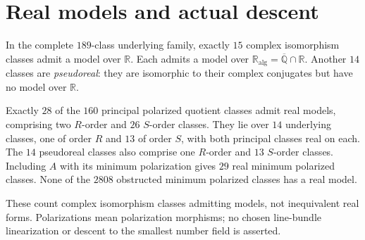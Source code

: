 \section{Real models and actual descent}
\begin{theorem}
\label{pp:thm:quotientrealmodels}
In the complete $189$-class underlying family, exactly $15$ complex
isomorphism classes admit a model over $\mathbb R$. Each admits a model
over $\mathbb R_{\mathrm{alg}}=\overline{\mathbb Q}\cap\mathbb R$.
Another $14$ classes are \emph{pseudoreal}: they are isomorphic to their
complex conjugates but have no model over $\mathbb R$.

Exactly $28$ of the $160$ principal polarized quotient classes admit
real models, comprising two $R$-order and $26$ $S$-order classes.
They lie over $14$ underlying classes, one of order $R$ and $13$ of
order $S$, with both principal classes real on each. The $14$ pseudoreal
classes also comprise one $R$-order and $13$ $S$-order classes.
Including $A$ with its minimum polarization gives $29$ real minimum
polarized classes. None of the $2808$ obstructed minimum polarized
classes has a real model.

These count complex isomorphism classes admitting models, not inequivalent
real forms. Polarizations mean polarization morphisms; no chosen line-bundle
linearization or descent to the smallest number field is asserted.
\end{theorem}
